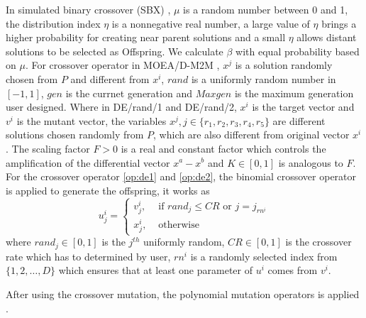 \documentclass[journal]{IEEEtran}
\begin{document}
In simulated binary crossover (SBX) \cite{sbc}, $\mu$ is a random number between 0 and 1, the distribution index $\eta$ is a nonnegative real number, a large value of $\eta$ brings a higher probability for creating near parent solutions and a small $\eta$ allows distant solutions to be selected as Offspring. We calculate $\beta$ with equal probability based on $\mu$.
For crossover operator in MOEA/D-M2M \cite{m2m}, $x^j$ is a solution randomly chosen from $P$ and different from $x^i$, $\textit{rand}$ is a uniformly random number in $[-1,1]$, $\textit{gen}$ is the currnet generation and $\textit{Maxgen}$ is the maximum generation user designed.
Where in DE/rand/1 and DE/rand/2, $x^i$ is the target vector and $v^i$ is the mutant vector, the variables $x^j, j \in \{r_1,r_2,r_3,r_4,r_5\}$ are different solutions chosen randomly from $P$, which are also different from original vector $x^i$. The scaling factor $F > 0$ is a real and constant factor which controls the amplification of the differential vector $x^a-x^b$ and $K \in [0,1]$ is analogous to $F$. For the crossover operator \ref{op:de1} and \ref{op:de2}, the binomial crossover operator \cite{storn1997differential} is applied to generate the offspring, it works as
\begin{equation}
  u_{j}^{i}=\left\{\begin{array}{ll}
    v_{j}^{i}, & \text { if }  { rand_j } \leq CR \text { or } j=j_{ {rn^i }} \\
    x_{j}^{i}, & \text { otherwise }
  \end{array}\right.
\end{equation}
where $rand_j \in [0,1]$ is the $j^{th}$ uniformly random, $CR \in [0,1]$ is the crossover rate which has to determined by user, $rn^i$ is a randomly selected index from $\{1,2,\dots,D\}$ which ensures that at least one parameter of $u^i$ comes from $v^i$.

After using the crossover mutation, the polynomial mutation operators is applied \cite{deb1996combined}.
\end{document}
